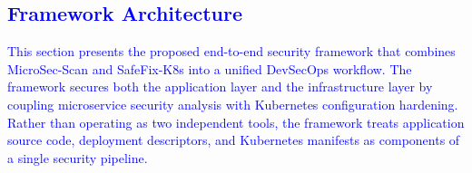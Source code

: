 \documentclass[preprint,12pt]{elsarticle}
\newcommand{\new}[1]{\textcolor{blue}{#1}}
\begin{document}

    \new{\section{Framework Architecture}}



\new{This section presents the proposed end-to-end security framework that combines
MicroSec-Scan and SafeFix-K8s into a unified DevSecOps workflow. The framework
secures both the application layer and the infrastructure layer by coupling
microservice security analysis with Kubernetes configuration hardening.
Rather than operating as two independent tools, the framework treats
application source code, deployment descriptors, and Kubernetes manifests
as components of a single security pipeline.}
\end{document}
